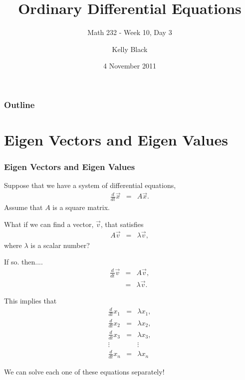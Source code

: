 \documentclass{beamer}
\newcommand{\deriv}[2]{\frac{d}{d#2}#1}
\begin{document}
\title{Ordinary Differential Equations}
\subtitle{Math 232 - Week 10, Day 3}

\author{Kelly Black}
\date{4 November 2011}

\begin{frame}
  \titlepage
\end{frame}

\begin{frame}
  \frametitle{Outline}
\end{frame}


\section{Eigen Vectors and Eigen Values}


\begin{frame}
  \frametitle{Eigen Vectors and Eigen Values}

  Suppose that we have a system of differential equations,
  \begin{eqnarray*}
    \frac{d}{dt} \vec{x} & = & A \vec{x}.
  \end{eqnarray*}
  Assume that $A$ is a square matrix.

  What if we can find a vector, $\vec{v}$, that satisfies
  \begin{eqnarray*}
    A \vec{v} & = & \lambda \vec{v},
  \end{eqnarray*}
  where $\lambda$ is a scalar number?

\end{frame}


\begin{frame}
  If so. then....
  \begin{eqnarray*}
    \frac{d}{dt} \vec{v} & = & A \vec{v}, \\
    & = & \lambda \vec{v}.
  \end{eqnarray*}
  
  This implies that
  \begin{eqnarray*}
    \deriv{x_1}{t} & = & \lambda x_1, \\
    \deriv{x_2}{t} & = & \lambda x_2, \\
    \deriv{x_3}{t} & = & \lambda x_3, \\
    \vdots         &   & \vdots \\
    \deriv{x_n}{t} & = & \lambda x_n
  \end{eqnarray*}

  We can solve each one of these equations separately!

\end{frame}
\end{document}
